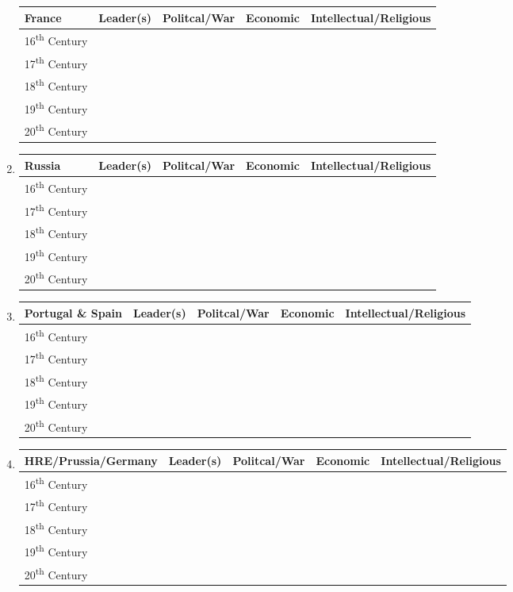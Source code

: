 \documentclass[12pt]{article}
\begin{document}
\begin{enumerate}
\begin{tabular}{l c c c c}
France & Leader(s) & Politcal/War & Economic & Intellectual/Religious \\
\hline
16\textsuperscript{th} Century & & & & \\
\hline
17\textsuperscript{th} Century & & & & \\
\hline
18\textsuperscript{th} Century & & & & \\
\hline
19\textsuperscript{th} Century & & & & \\
\hline
20\textsuperscript{th} Century & & & & \\

\end{tabular}

\item \begin{tabular}{l c c c c}

Russia & Leader(s) & Politcal/War & Economic & Intellectual/Religious \\
\hline
16\textsuperscript{th} Century & & & & \\
\hline
17\textsuperscript{th} Century & & & & \\
\hline
18\textsuperscript{th} Century & & & & \\
\hline
19\textsuperscript{th} Century & & & & \\
\hline
20\textsuperscript{th} Century & & & & \\

\end{tabular}

\item \begin{tabular}{l c c c c}

Portugal \& Spain & Leader(s) & Politcal/War & Economic & Intellectual/Religious \\
\hline
16\textsuperscript{th} Century & & & & \\
\hline
17\textsuperscript{th} Century & & & & \\
\hline
18\textsuperscript{th} Century & & & & \\
\hline
19\textsuperscript{th} Century & & & & \\
\hline
20\textsuperscript{th} Century & & & & \\

\end{tabular}

\item \begin{tabular}{l c c c c}

HRE/Prussia/Germany & Leader(s) & Politcal/War & Economic & Intellectual/Religious \\
\hline
16\textsuperscript{th} Century & & & & \\
\hline
17\textsuperscript{th} Century & & & & \\
\hline
18\textsuperscript{th} Century & & & & \\
\hline
19\textsuperscript{th} Century & & & & \\
\hline
20\textsuperscript{th} Century & & & & \\


\end{tabular}
\end{enumerate}
\end{document}
